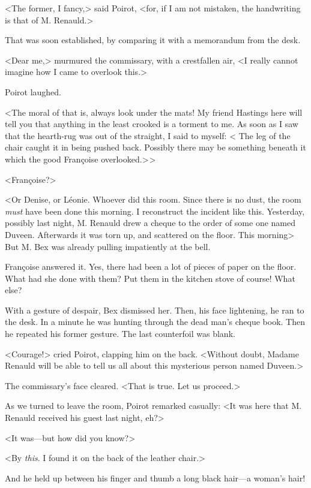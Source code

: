  <The former, I fancy,> said Poirot, <for, if I am not mistaken, the handwriting is that of M. Renauld.> 

 That was soon established, by comparing it with a memorandum from the desk. 

 <Dear me,> murmured the commissary, with a crestfallen air, <I really cannot imagine how I came to overlook this.> 

 Poirot laughed. 

 <The moral of that is, always look under the mats! My friend Hastings here will tell you that anything in the least crooked is a torment to me. As soon as I saw that the hearth-rug was out of the straight, I said to myself: < The leg of the chair caught it in being pushed back. Possibly there may be something beneath it which the good Françoise overlooked.> > 

 <Françoise?> 

 <Or Denise, or Léonie. Whoever did this room. Since there is no dust, the room \emph{must} have been done this morning. I reconstruct the incident like this. Yesterday, possibly last night, M. Renauld drew a cheque to the order of some one named Duveen. Afterwards it was torn up, and scattered on the floor. This morning\longdash> But M. Bex was already pulling impatiently at the bell. 

 Françoise answered it. Yes, there had been a lot of pieces of paper on the floor. What had she done with them? Put them in the kitchen stove of course! What else? 

 With a gesture of despair, Bex dismissed her. Then, his face lightening, he ran to the desk. In a minute he was hunting through the dead man's cheque book. Then he repeated his former gesture. The last counterfoil was blank. 

 <Courage!> cried Poirot, clapping him on the back. <Without doubt, Madame Renauld will be able to tell us all about this mysterious person named Duveen.> 

 The commissary's face cleared. <That is true. Let us proceed.> 

 As we turned to leave the room, Poirot remarked casually: <It was here that M. Renauld received his guest last night, eh?> 

 <It was—but how did you know?> 

 <By \emph{this}. I found it on the back of the leather chair.> 

 And he held up between his finger and thumb a long black hair—a woman's hair! 

